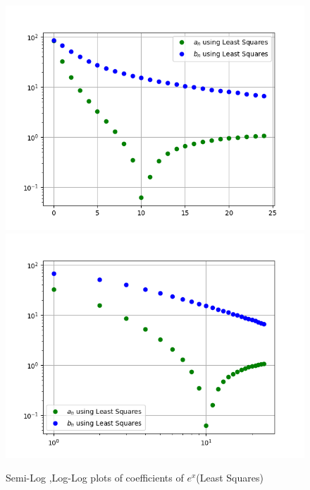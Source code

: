 \documentclass[11pt, a4paper]{article}
\begin{document}
\begin{figure}[!tbh]
     \centering
     \includegraphics[scale=0.7]{./../Extras/9.png}  
     \includegraphics[scale=0.7]{./../Extras/10.png}  
     \caption{Semi-Log ,Log-Log plots of coefficients of $e^x$(Least Squares)}  
\end{figure}
\end{document}
